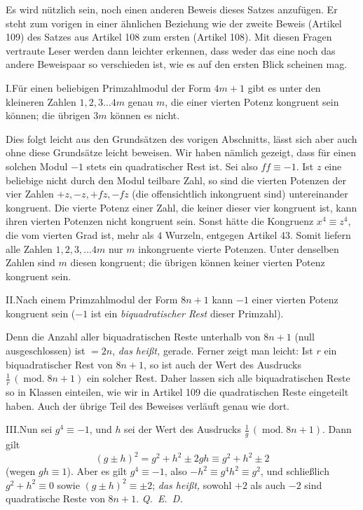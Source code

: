 Es wird nützlich sein, noch einen anderen Beweis dieses Satzes anzufügen. Er steht zum vorigen in einer ähnlichen Beziehung wie der zweite Beweis (Artikel 109) des Satzes aus Artikel 108 zum ersten (Artikel 108). Mit diesen Fragen vertraute Leser werden dann leichter erkennen, dass weder das eine noch das andere Beweispaar so verschieden ist, wie es auf den ersten Blick scheinen mag.

I.\quad Für einen beliebigen Primzahlmodul der Form $4m+1$ gibt es unter den kleineren Zahlen $1,2,3\ldots4m$ genau $m$, die einer vierten Potenz kongruent sein können; die übrigen $3m$ können es nicht.

Dies folgt leicht aus den Grundsätzen des vorigen Abschnitts, lässt sich aber auch ohne diese Grundsätze leicht beweisen. Wir haben nämlich gezeigt, dass für einen solchen Modul $-1$ stets ein quadratischer Rest ist. Sei also $ff\equiv-1$. Ist $z$ eine beliebige nicht durch den Modul teilbare Zahl, so sind die vierten Potenzen der vier Zahlen $+z,-z,+fz,-fz$ (die offensichtlich inkongruent sind) untereinander kongruent. Die vierte Potenz einer Zahl, die keiner dieser vier kongruent ist, kann ihren vierten Potenzen nicht kongruent sein. Sonst hätte die Kongruenz $x^4\equiv z^4$, die vom vierten Grad ist, mehr als $4$ Wurzeln, entgegen Artikel 43. Somit liefern alle Zahlen $1,2,3,\ldots4m$ nur $m$ inkongruente vierte Potenzen. Unter denselben Zahlen sind $m$ diesen kongruent; die übrigen können keiner vierten Potenz kongruent sein.

II.\quad Nach einem Primzahlmodul der Form $8n+1$ kann $-1$ einer vierten Potenz kongruent sein ($-1$ ist ein \emph{biquadratischer Rest} dieser Primzahl).

Denn die Anzahl aller biquadratischen Reste unterhalb von $8n+1$ (null ausgeschlossen) ist $=2n$, \emph{das heißt,} gerade. Ferner zeigt man leicht: Ist $r$ ein biquadratischer Rest von $8n+1$, so ist auch der Wert des Ausdrucks $\frac{1}{r}\,(\operatorname{mod.}8n+1)$ ein solcher Rest. Daher lassen sich alle biquadratischen Reste so in Klassen einteilen, wie wir in Artikel 109 die quadratischen Reste eingeteilt haben. Auch der übrige Teil des Beweises verläuft genau wie dort.

III.\quad Nun sei $g^4\equiv-1$, und $h$ sei der Wert des Ausdrucks $\frac{1}{g}\,(\operatorname{mod.}8n+1)$. Dann gilt
\[
(g\pm h)^2=g^2+h^2\pm2gh\equiv g^2+h^2\pm2
\]
(wegen $gh\equiv1$). Aber es gilt $g^4\equiv-1$, also $-h^2\equiv g^4h^2\equiv g^2$, und schließlich $g^2+h^2\equiv0$ sowie $(g\pm h)^2\equiv\pm2$; \emph{das heißt,} sowohl $+2$ als auch $-2$ sind quadratische Reste von $8n+1$. \mbox{\emph{Q. E. D.}}

